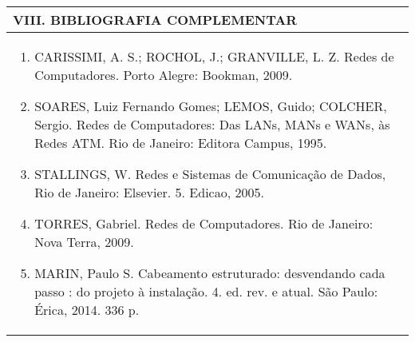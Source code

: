 \documentclass[12pt]{article}
\begin{document}

\begin{longtable}{|L{1.025\textwidth}|} \hline
%
{\bf VIII. BIBLIOGRAFIA COMPLEMENTAR} \\ \hline
\begin{enumerate}
\item CARISSIMI, A. S.; ROCHOL, J.; GRANVILLE, L. Z. Redes de Computadores. Porto Alegre: Bookman, 2009.
\item SOARES, Luiz Fernando Gomes; LEMOS, Guido; COLCHER, Sergio. Redes de Computadores: Das LANs, MANs e WANs, às Redes ATM. Rio de Janeiro: Editora Campus, 1995.
\item STALLINGS, W. Redes e Sistemas de Comunicação de Dados, Rio de Janeiro: Elsevier. 5. Edicao, 2005.
\item TORRES, Gabriel. Redes de Computadores. Rio de Janeiro: Nova Terra, 2009. 
\item MARIN, Paulo S. Cabeamento estruturado: desvendando cada passo : do projeto à instalação. 4. ed. rev. e atual. São Paulo: Érica, 2014. 336 p.
%
\end{enumerate}
 \\ \hline
\end{longtable}



\end{document}

